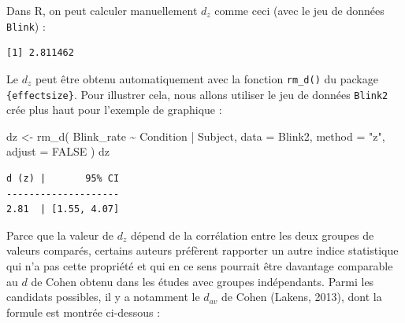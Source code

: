 \documentclass[
  letterpaper,
]{book}
\newenvironment{Shaded}{\begin{snugshade}}{\end{snugshade}}
\newcommand{\AttributeTok}[1]{\textcolor[rgb]{0.40,0.45,0.13}{#1}}
\newcommand{\CommentTok}[1]{\textcolor[rgb]{0.37,0.37,0.37}{#1}}
\newcommand{\ConstantTok}[1]{\textcolor[rgb]{0.56,0.35,0.01}{#1}}
\newcommand{\FunctionTok}[1]{\textcolor[rgb]{0.28,0.35,0.67}{#1}}
\newcommand{\NormalTok}[1]{\textcolor[rgb]{0.00,0.23,0.31}{#1}}
\newcommand{\OtherTok}[1]{\textcolor[rgb]{0.00,0.23,0.31}{#1}}
\newcommand{\SpecialCharTok}[1]{\textcolor[rgb]{0.37,0.37,0.37}{#1}}
\newcommand{\StringTok}[1]{\textcolor[rgb]{0.13,0.47,0.30}{#1}}
\begin{document}
Dans R, on peut calculer manuellement \(d_z\) comme ceci (avec le jeu de
données \texttt{Blink}) :

\begin{Shaded}
\end{Shaded}

\begin{verbatim}
[1] 2.811462
\end{verbatim}

Le \(d_{z}\) peut être obtenu automatiquement avec la fonction
\texttt{rm\_d()} du package \texttt{\{effectsize\}}. Pour illustrer
cela, nous allons utiliser le jeu de données \texttt{Blink2} crée plus
haut pour l'exemple de graphique :

\begin{Shaded}
\begin{Highlighting}[]
\NormalTok{dz }\OtherTok{\textless{}{-}}
  \FunctionTok{rm\_d}\NormalTok{(}
\NormalTok{    Blink\_rate }\SpecialCharTok{\textasciitilde{}}\NormalTok{ Condition }\SpecialCharTok{|}\NormalTok{ Subject,}
    \AttributeTok{data =}\NormalTok{ Blink2,}
    \AttributeTok{method =} \StringTok{"z"}\NormalTok{,}
    \AttributeTok{adjust =} \ConstantTok{FALSE}
\NormalTok{  )}
\NormalTok{dz}
\end{Highlighting}
\end{Shaded}

\begin{verbatim}
d (z) |       95% CI
--------------------
2.81  | [1.55, 4.07]
\end{verbatim}

Parce que la valeur de \(d_z\) dépend de la corrélation entre les deux
groupes de valeurs comparés, certains auteurs préfèrent rapporter un
autre indice statistique qui n'a pas cette propriété et qui en ce sens
pourrait être davantage comparable au \(d\) de Cohen obtenu dans les
études avec groupes indépendants. Parmi les candidats possibles, il y a
notamment le \(d_{av}\) de Cohen (Lakens, 2013), dont la formule est
montrée ci-dessous :
\end{document}
